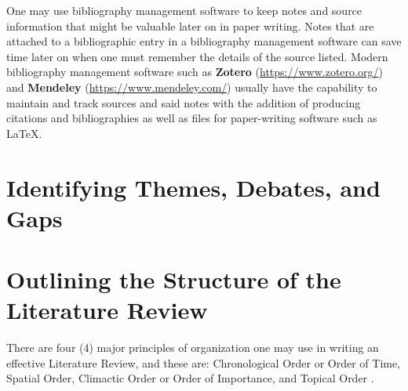 \documentclass{strrespaper-trad}
\begin{document}
			One may use bibliography management software to keep notes and source information that might be valuable later on in paper writing.
			Notes that are attached to a bibliographic entry in a bibliography management software can save time later on when one must remember the details of the source listed.
			Modern bibliography management software such as \textbf{Zotero} (\url{https://www.zotero.org/}) and \textbf{Mendeley} (\url{https://www.mendeley.com/}) usually have the capability to maintain and track sources and said notes with the addition of producing citations and bibliographies as well as files for paper-writing software such as \LaTeX.

		\section*{Identifying Themes, Debates, and Gaps}

		\section*{Outlining the Structure of the Literature Review}
			There are four (4) major principles of organization one may use in writing an effective Literature Review, and these are: Chronological Order or Order of Time, Spatial Order, Climactic Order or Order of Importance, and Topical Order \autocite{friedlanderPrinciplesOrganization2004}.
\end{document}
